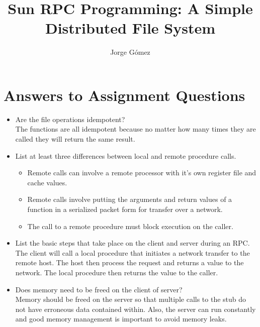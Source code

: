 \documentclass{article}
\title{Sun RPC Programming: A Simple Distributed File System}
\author{Jorge G\'omez}
\begin{document}
\maketitle
\section{Answers to Assignment Questions}
  \begin{itemize}
    \item Are the file operations idempotent?\\
      The functions are all idempotent because no matter how many times they are
      called they will return the same result.
    \item List at least three differences between local and remote procedure calls.
	\begin{itemize}
          \item Remote calls can involve a remote processor with it's own register file
            and cache values.
          \item Remote calls involve putting the arguments and return values of a function
            in a serialized packet form for transfer over a network.
          \item The call to a remote procedure must block execution on the caller.
        \end{itemize}
    \item List the basic steps that take place on the client and server during an RPC.\\
      The client will call a local procedure that initiates a network transfer to the remote
      host. The host then process the request and returns a value to the network. The local
      procedure then returns the value to the caller.
    \item Does memory need to be freed on the client of server?\\
      Memory should be freed on the server so that multiple calls to the stub do not have
      erroneous data contained within. Also, the server can run constantly and good memory
      management is important to avoid memory leaks.
  \end{itemize}
\end{document}
